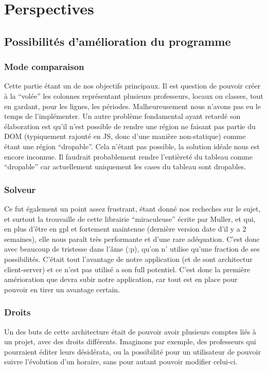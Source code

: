 \chapter{Perspectives}

\section{Possibilités d'amélioration du programme}

\subsection{Mode comparaison}
Cette partie étant un de nos objectifs principaux. Il est question de pouvoir créer à la
\enquote{volée} les colonnes représentant plusieurs professeurs, locaux ou classes, tout
 en gardant, pour les lignes, les périodes. Malheureusement nous n'avons pas eu le temps de l'implémenter. Un autre problème fondamental ayant retardé son élaboration est qu'il n'est  possible de rendre une région ne faisant pas partie du DOM (typiquement rajouté 
en JS, donc d'une manière non-statique) comme étant une région \enquote{dropable}.
Cela n'étant pas possible, la solution idéale nous est encore inconnue. Il faudrait probablement rendre l'entièreté du tableau comme \enquote{dropable} car actuellement uniquement les cases du tableau sont dropables.

\subsection{Solveur}
Ce fut également un point assez frustrant, étant donné nos recheches 
sur le sujet, et surtout la trouvaille de cette librairie ``miraculeuse'' écrite 
par Muller, et qui, en plus d'être en gpl et fortement maintenue (dernière 
version date d'il y a 2 semaines), elle nous paraît très performante et d'une 
rare adéquation.  C'est donc avec beaucoup de tristesse dans l’âme (:p), qu'on n'
utilise qu'une fraction de ses possibilités.  C'était tout l'avantage de notre 
application (et de sont architectur client-server) et ce n'est pas utilisé a son
full potentiel.  C'est donc la première amérioration que devra subir notre
application, car tout est en place pour pouvoir en tirer un avantage certain.

\subsection{Droits}
Un des buts de cette architecture était de pouvoir avoir plusieurs comptes liés à
un projet, avec des droits différents. Imaginons par exemple, des professeurs qui pourraient
 éditer leurs désidérata, ou la possibilité pour un utilisateur de pouvoir suivre l'évolution d'un horaire, sans pour autant pouvoir modifier celui-ci.

